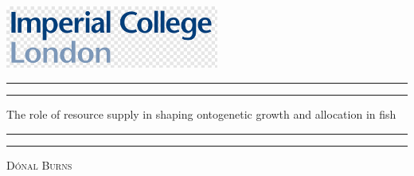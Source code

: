 
\begin{titlepage} %
	\includegraphics[width = 7cm, keepaspectratio, left]{../images/imperial_logo}
	\centering %
	
	\scshape %
	
	
	
	\rule{\textwidth}{1.6pt}\vspace*{-\baselineskip}\vspace*{2pt} %
	\rule{\textwidth}{0.4pt} %
	
	\vspace{0.75\baselineskip} %
	
	{\LARGE The role of resource supply in shaping ontogenetic growth and allocation  in fish\\} %
	
	\vspace{0.75\baselineskip} %
	
	\rule{\textwidth}{0.4pt}\vspace*{-\baselineskip}\vspace{3.2pt} %
	\rule{\textwidth}{1.6pt} %
	
	\vspace{1\baselineskip} %
	
	
	
	
	\vspace{0.5\baselineskip} %
	
	{\scshape\Large D\'onal Burns  \\} %
	

\end{titlepage}
